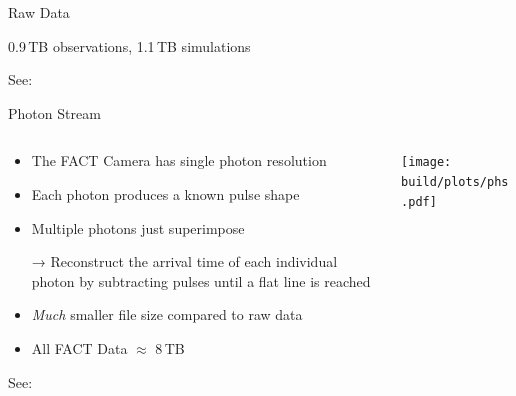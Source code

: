 \documentclass[compress, 9pt, aspectratio=1610, professionalfonts]{beamer}
\begin{document}
\begin{frame}[t]{Raw Data}
\begin{itemize}
      \vspace{0.2cm}
      \begin{center}
        \LARGE 0.9\,TB observations, 1.1\,TB simulations
      \end{center}
  \end{itemize}
    
  \begin{center}
    \small See: \cite{zfits}
  \end{center}
\end{frame}

\begin{frame}[c]{Photon Stream}
  \begin{columns}[onlytextwidth]
    \begin{column}{0.475\textwidth}
      \begin{itemize}
        \item The FACT Camera has single photon resolution
        \item Each photon produces a known pulse shape 
        \item Multiple photons just superimpose
        \item[→] Reconstruct the arrival time of each individual photon by subtracting pulses until a flat line is reached
        \item \emph{Much} smaller file size compared to raw data
        \item All FACT Data $\approx{}$ 8\,TB
      \end{itemize}
      \begin{center}
        \small See: \cite{photonstream}
      \end{center}
    \end{column}
    \begin{column}{0.475\textwidth}
      \texttt{[image: build/plots/phs.pdf]}
    \end{column}
  \end{columns}
\end{frame}
\end{document}
